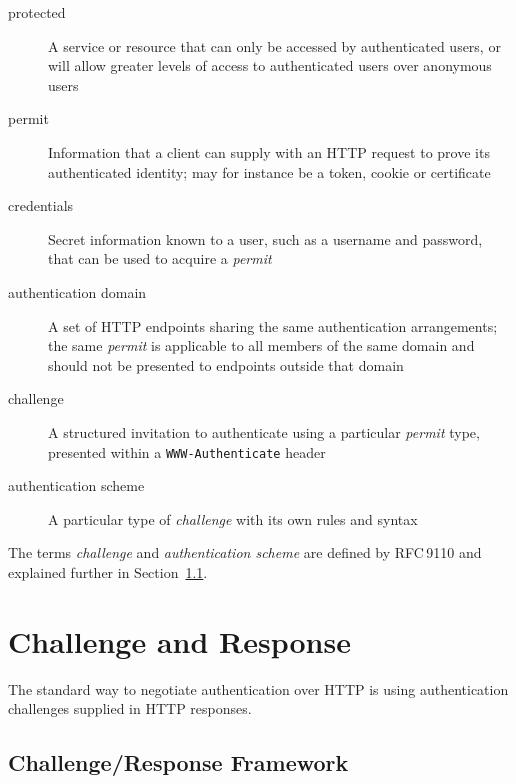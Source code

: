 \documentclass[11pt,a4paper]{ivoa}
\newcommand{\rfc}[1]{RFC\,#1}
\newcommand{\header}[1]{{\tt #1}}
\begin{document}
\begin{description}
\item[protected]
      A service or resource that can only be accessed by authenticated users,
      or will allow greater levels of access to authenticated users over
      anonymous users
\item[permit]
      Information that a client can supply with an HTTP request to
      prove its authenticated identity;
      may for instance be a token, cookie or certificate
\item[credentials]
      Secret information known to a user, such as a username and password,
      that can be used to acquire a {\em permit}
\item[authentication domain]
      A set of HTTP endpoints sharing the same authentication arrangements;
      the same {\em permit\/} is applicable to all members of the same domain
      and should not be presented to endpoints outside that domain
\item[challenge]
      A structured invitation to authenticate using
      a particular {\em permit\/} type,
      presented within a \header{WWW-Authenticate} header
\item[authentication scheme]
      A particular type of {\em challenge\/} with its own rules and syntax
\end{description}
The terms {\em challenge\/} and {\em authentication scheme} are
defined by \rfc{9110}
and explained further in Section~\ref{sec:challenge-response}.


\section{Challenge and Response}

The standard way to negotiate authentication over HTTP is using 
authentication challenges supplied in HTTP responses.

\subsection{Challenge/Response Framework}
\label{sec:challenge-response}
\end{document}
